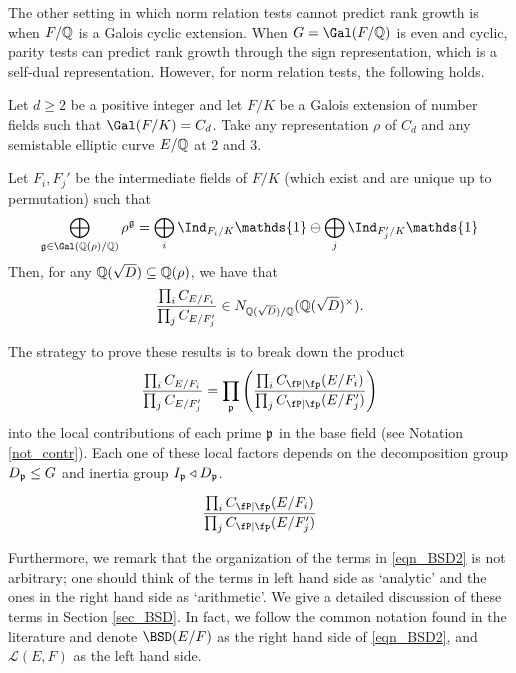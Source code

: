 
The other setting in which norm relation tests cannot predict rank growth is when $F/\mathbb{Q}$ is a Galois cyclic extension. When $G=\Gal(F/\QQ)$ is even and cyclic, parity tests can predict rank growth through the sign representation, which is a self-dual representation. However, for norm relation tests, the following holds.

\begin{thm}\label{thm_cyclic-cons}
    Let $d\geq2$ be a positive integer and let $F/K$ be a Galois extension of number fields such that $\Gal(F/K)=C_d$. Take any representation $\rho$ of $C_d$ and any semistable elliptic curve $E/\mathbb{Q}$ at $2$ and $3$. 
    
    Let $F_i,F_j'$ be the intermediate fields of $F/K$ (which exist and are unique up to permutation) such that 
    \begin{equation*}%
        \bigoplus_{\mathfrak{g}\in\Gal(\QQ(\rho)/\QQ)}\rho^{\mathfrak{g}}=\bigoplus_i\Ind_{F_i/K}\mathds{1}\ominus\bigoplus_j\Ind_{F'_j/K}\mathds{1}
    \end{equation*}
    Then, for any $\mathbb{Q}(\sqrt{D})\subseteq\mathbb{Q}(\rho)$, we have that
    $$\frac{\prod_i C_{E/F_i}}{\prod_j C_{E/F_j'}}\in N_{\mathbb{Q}(\sqrt{D})/\mathbb{Q}}(\mathbb{Q}(\sqrt{D})^{\times}).$$
\end{thm}

The strategy to prove these results is to break down the product 
$$\frac{\prod_i C_{E/F_i}}{\prod_j C_{E/F_j'}}=\prod_{\pp}\left(\frac{\prod_i \Cp(E/F_i)}{\prod_j \Cp(E/F_j')}\right)$$
into the local contributions of each prime $\mathfrak{p}$ in the base field (see Notation \ref{not_contr}). Each one of these local factors depends on the decomposition group $D_{\mathfrak{p}}\leq G$ and inertia group $I_{\mathfrak{p}}\triangleleft D_{\mathfrak{p}}$. 

$$\frac{\prod_i \Cp(E/F_i)}{\prod_j \Cp(E/F_j')}$$

\newpage




Furthermore, we remark that the organization of the terms in \eqref{eqn_BSD2} is not arbitrary; one should think of the terms in left hand side as `analytic' and the ones in the right hand side as `arithmetic'. We give a detailed discussion of these terms in Section \ref{sec_BSD}. In fact, we follow the common notation found in the literature and denote $\BSD(E/F)$ as the right hand side of \eqref{eqn_BSD2}, and $\mathcal{L}(E,F)$ as the left hand side.

